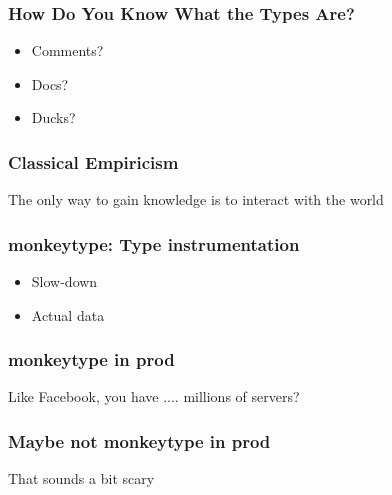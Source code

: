 \begin{frame}
\frametitle{How Do You Know What the Types Are?}

\begin{itemize}
\item Comments?
\item Docs?
\item Ducks?
\end{itemize}

\end{frame}

\begin{frame}
\frametitle{Classical Empiricism}

The only way to gain knowledge is to interact with the world

\end{frame}

\begin{frame}
\frametitle{monkeytype: Type instrumentation}

\begin{itemize}
\item Slow-down
\item Actual data
\end{itemize}
\end{frame}

\begin{frame}
\frametitle{monkeytype in prod}

Like Facebook, you have .... millions of servers?

\end{frame}

\begin{frame}
\frametitle{Maybe not monkeytype in prod}

That sounds a bit scary

\end{frame}






